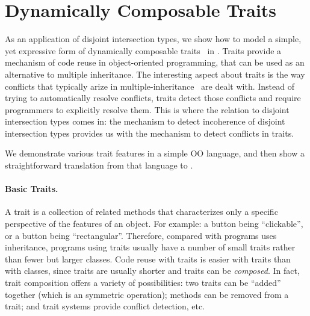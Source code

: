 \section{Dynamically Composable Traits} \label{sec:trait}


As an application of disjoint intersection types, we show how to model a
simple, yet expressive form of dynamically composable
traits~\cite{scharli2003traits} in \name. Traits provide a
mechanism of code reuse in object-oriented programming, that
can be used as an alternative to multiple inheritance. 
The interesting aspect about traits is the way conflicts that
typically arize in multiple-inheritance~\cite{} are dealt with. 
Instead of trying to automatically resolve conflicts, traits 
detect those conflicts and require programmers to explicitly resolve
them. This is where the relation to disjoint intersection types comes
in: the mechanism to detect incoherence of disjoint intersection types
provides us with the mechanism to detect conflicts in traits. 

We demonstrate various trait
features in a simple OO language, and then show a straightforward
translation from that language to \name. 

\paragraph{Basic Traits.}

A trait is a collection of related methods that characterizes only a specific
perspective of the features of an object. For example: a button being
``clickable'', or a button being ``rectangular''. Therefore, compared with
programs uses inheritance, programs using traits usually have a number of small
traits rather than fewer but larger classes. Code reuse with traits is easier
with traits than with classes, since traits are usually shorter and traits can
be \emph{composed}. In fact, trait composition offers a variety of
possibilities: two traits can be ``added'' together (which is an symmetric
operation); methods can be removed from a trait; and trait systems provide
conflict detection, etc.


